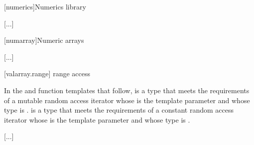 
[numerics]{Numerics library}

[...]

\setcounter{section}{7}
[numarray]{Numeric arrays}

[...]

\setcounter{subsection}{9}
[valarray.range]{ range access}

\pnum
In the  and  function templates that follow, 
is a type that meets the requirements of a mutable random access
iterator
whose  is the template
parameter  and whose  type is .  is a
type that meets the requirements of a constant random access
iterator
whose  is the template
parameter  and whose  type is .

[...]
